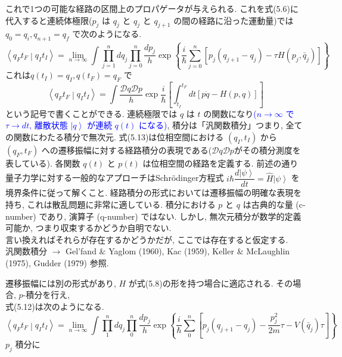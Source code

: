 \documentclass[a4paper,12pt]{article}
\newcommand{\ket}[1]{\left|#1\right\rangle}
\newcommand{\braket}[2]{\left\langle #1\middle|#2\right\rangle}
\begin{document}
これで1つの可能な経路の区間上のプロパゲータが与えられる. これを式(5.6)に代入すると連続体極限($p_{j}$ は $q_{j}$ と $q_{j}$ と $q_{j+1}$ の間の経路に沿った運動量)では $q_{0} = q_{i}, q_{n+1} = q_{f}$ で次のようになる.
\begin{equation*}
    \braket{q_{F}t_{F}}{q_{I}t_{I}} = \lim_{n \rightarrow \infty} \int \prod_{j=1}^{n} dq_{j} \prod_{j=0}^{n}\frac{dp_{j}}{h}\exp\left\{ \frac{i}{\hbar}\sum_{j=0}^{n} [p_{j}(q_{j+1} - q_{j}) - \tau H(p_{j}, \bar{q}_{j})]\right\} \tag{5.12}
\end{equation*}
これは$q(t_I) = q_{I}, q(t_{F}) = q_{F}$ で
\begin{equation*}
    \braket{q_{F}t_{F}}{q_{I}t_{I}} = \int \frac{\mathcal{D}q\mathcal{D}p}{h}\exp\frac{i}{\hbar}\left[ \int_{t_{I}}^{t_{F}} dt [p\dot{q} - H(p, q)] \right] \tag{5.13}
\end{equation*}
という記号で書くことができる. 連続極限では $q$ は $t$ の関数になり\textcolor{blue}{($n \to \infty$ で $\tau \to dt$, 離散状態 $\ket{q}$ が連続 $q(t)$ になる)}, 積分は「汎関数積分」つまり, 全ての関数にわたる積分で無次元. 式(5.13)は位相空間における $(q_{I}, t_{I})$ から $(q_{F}, t_{F})$ への遷移振幅に対する経路積分の表現である\color{blue}($\mathcal{D}q\mathcal{D}p$がその積分測度を表している)\color{black}. 各関数 $q(t)$ と $p(t)$ は位相空間の経路を定義する. 前述の通り量子力学に対する一般的なアプローチはSchr\"{o}dinger方程式 $i\hbar\dfrac{d\ket{\psi}}{dt} = \hat{H}\ket{\psi}$ を境界条件に従って解くこと. 経路積分の形式においては遷移振幅の明確な表現を持ち, これは散乱問題に非常に適している. 積分における $p$ と $q$ は古典的な量 (c-number) であり, 演算子 (q-number) ではない. しかし, 無次元積分が数学的定義可能か, つまり収束するかどうか自明でない.\\
言い換えればそれらが存在するかどうかだが, ここでは存在すると仮定する.\\
汎関数積分 $\rightarrow$ Gel'fand $\&$ Yaglom (1960), Kac (1959), Keller $\&$ McLaughlin (1975), Gudder (1979) 参照. \par
遷移振幅には別の形式があり, $H$ が式(5.8)の形を持つ場合に適応される. その場合, $p$-積分を行え,\\
式(5.12)は次のようになる.
\begin{equation*}
    \braket{q_{F}t_{F}}{q_{I}t_{I}} = \lim_{n \rightarrow \infty} \int \prod_{1}^{n}dq_{j}\prod_{0}^{n}\frac{dp_{j}}{h}\exp\left\{ \frac{i}{\hbar}\sum_{0}^{n}\left[ p_{j}(q_{j+1} - q_{j}) - \frac{p^{2}_{j}}{2m}\tau - V(\bar{q}_{j})\tau \right] \right\}
\end{equation*}
$p_{j}$ 積分に
\end{document}
